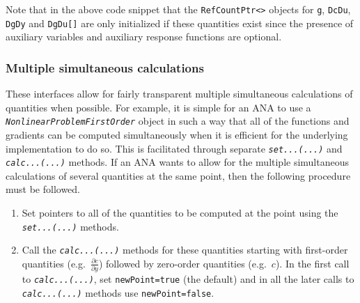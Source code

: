 Note that in the above code snippet that the
\texttt{RefCountPtr<>} objects for \texttt{g}, \texttt{DcDu},
\texttt{DgDy} and \texttt{DgDu[]} are only initialized if these quantities
exist since the presence of auxiliary variables and auxiliary response
functions are optional.

%
\subsubsection{Multiple simultaneous calculations}
%

These interfaces allow for fairly transparent multiple simultaneous
calculations of quantities when possible.  For example, it is simple
for an ANA to use a \texttt{\textit{Nonlinear\-Problem\-First\-Order}}
object in such a way that all of the functions and gradients can be
computed simultaneously when it is efficient for the underlying
implementation to do so.  This is facilitated through separate
\texttt{\textit{set...(...)}} and \texttt{\textit{calc...(...)}} methods.
If an ANA wants to allow for the multiple simultaneous calculations of
several quantities at the same point, then the following procedure
must be followed.

\begin{enumerate}
\item Set pointers to all of the quantities to be computed at the point
using the \texttt{\textit{set...(...)}} methods.
\item Call the \texttt{\textit{calc...(...)}} methods for these quantities
starting with first-order quantities (e.g.~$\frac{\partial c}{\partial
y}$) followed by zero-order quantities (e.g.~$c$).  In the first call
to \texttt{\textit{calc...(...)}}, set \texttt{newPoint=true} (the default) and
in all the later calls to \texttt{\textit{calc...(...)}} methods use
\texttt{newPoint=false}.
\end{enumerate}

